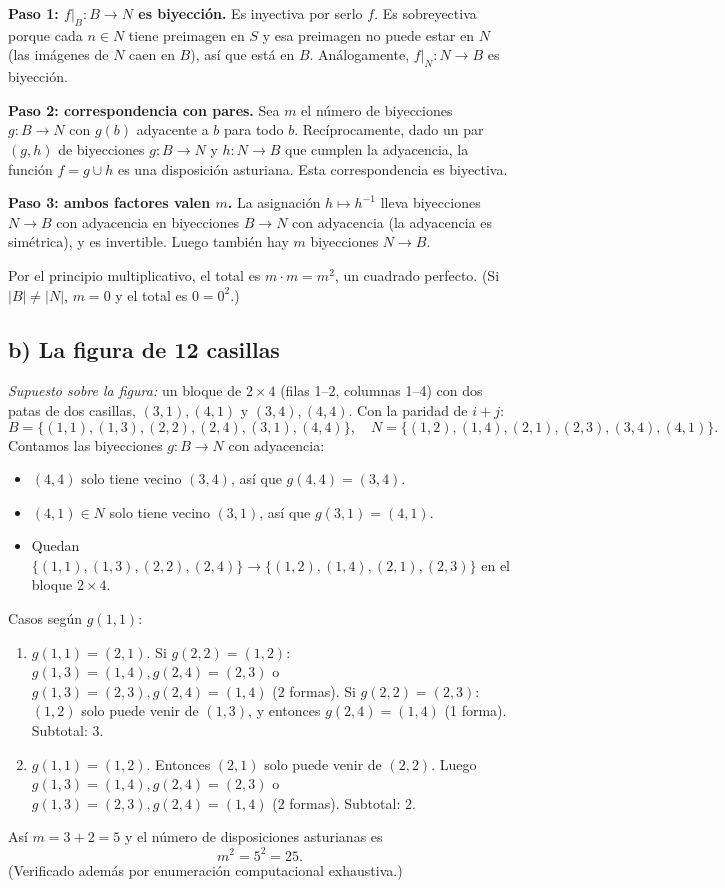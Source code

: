 \documentclass[11pt]{article}
\begin{document}
\textbf{Paso 1: $f|_B:B\to N$ es biyección.} Es inyectiva por serlo $f$. Es sobreyectiva porque cada $n\in N$ tiene preimagen en $S$ y esa preimagen no puede estar en $N$ (las imágenes de $N$ caen en $B$), así que está en $B$. Análogamente, $f|_N:N\to B$ es biyección.

\textbf{Paso 2: correspondencia con pares.} Sea $m$ el número de biyecciones $g:B\to N$ con $g(b)$ adyacente a $b$ para todo $b$. Recíprocamente, dado un par $(g,h)$ de biyecciones $g:B\to N$ y $h:N\to B$ que cumplen la adyacencia, la función $f=g\cup h$ es una disposición asturiana. Esta correspondencia es biyectiva.

\textbf{Paso 3: ambos factores valen $m$.} La asignación $h\mapsto h^{-1}$ lleva biyecciones $N\to B$ con adyacencia en biyecciones $B\to N$ con adyacencia (la adyacencia es simétrica), y es invertible. Luego también hay $m$ biyecciones $N\to B$.

Por el principio multiplicativo, el total es $m\cdot m=m^2$, un cuadrado perfecto. (Si $|B|\neq|N|$, $m=0$ y el total es $0=0^2$.)

\subsection*{b) La figura de 12 casillas}

\emph{Supuesto sobre la figura:} un bloque de $2\times 4$ (filas 1--2, columnas 1--4) con dos patas de dos casillas, $(3,1),(4,1)$ y $(3,4),(4,4)$. Con la paridad de $i+j$:
\[
B=\{(1,1),(1,3),(2,2),(2,4),(3,1),(4,4)\},\quad
N=\{(1,2),(1,4),(2,1),(2,3),(3,4),(4,1)\}.
\]
Contamos las biyecciones $g:B\to N$ con adyacencia:
\begin{itemize}
\item $(4,4)$ solo tiene vecino $(3,4)$, así que $g(4,4)=(3,4)$.
\item $(4,1)\in N$ solo tiene vecino $(3,1)$, así que $g(3,1)=(4,1)$.
\item Quedan $\{(1,1),(1,3),(2,2),(2,4)\}\to\{(1,2),(1,4),(2,1),(2,3)\}$ en el bloque $2\times4$.
\end{itemize}
Casos según $g(1,1)$:
\begin{enumerate}
\item $g(1,1)=(2,1)$. Si $g(2,2)=(1,2)$: $g(1,3)=(1,4),g(2,4)=(2,3)$ o $g(1,3)=(2,3),g(2,4)=(1,4)$ (2 formas). Si $g(2,2)=(2,3)$: $(1,2)$ solo puede venir de $(1,3)$, y entonces $g(2,4)=(1,4)$ (1 forma). Subtotal: $3$.
\item $g(1,1)=(1,2)$. Entonces $(2,1)$ solo puede venir de $(2,2)$. Luego $g(1,3)=(1,4),g(2,4)=(2,3)$ o $g(1,3)=(2,3),g(2,4)=(1,4)$ (2 formas). Subtotal: $2$.
\end{enumerate}
Así $m=3+2=5$ y el número de disposiciones asturianas es
\[
m^2=5^2=\boxed{25}.
\]
(Verificado además por enumeración computacional exhaustiva.)
\end{document}
